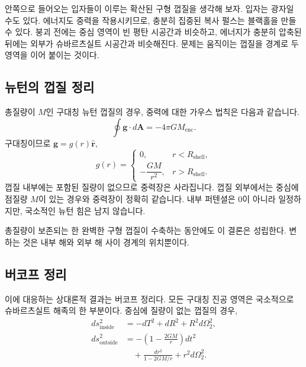 안쪽으로 들어오는 입자들이 이루는 확산된 구형 껍질을 생각해 보자. 입자는 광자일 수도 있다. 에너지도 중력을 작용시키므로, 충분히 집중된 복사 펄스는 블랙홀을 만들 수 있다. 붕괴 전에는 중심 영역이 빈 평탄 시공간과 비슷하고, 에너지가 충분히 압축된 뒤에는 외부가 슈바르츠실트 시공간과 비슷해진다. 문제는 움직이는 껍질을 경계로 두 영역을 이어 붙이는 것이다.

\subsection{뉴턴의 껍질 정리}

총질량이 \(M\)인 구대칭 뉴턴 껍질의 경우, 중력에 대한 가우스 법칙은 다음과 같습니다.
\begin{equation}
\oint \mathbf{g}\cdot d\mathbf{A}=-4\pi G M_{\mathrm{enc}}.
\label{eq:l04-gauss-gravity}
\end{equation}
구대칭이므로 \(\mathbf{g}=g(r)\hat{\mathbf r}\),
\begin{equation}
g(r)=
\begin{cases}
0, & r<R_{\mathrm{shell}},\\[4pt]
-\dfrac{GM}{r^2}, & r>R_{\mathrm{shell}}.
\end{cases}
\label{eq:l04-shell-field}
\end{equation}
껍질 내부에는 포함된 질량이 없으므로 중력장은 사라집니다. 껍질 외부에서는 중심에 점질량 \(M\)이 있는 경우와 중력장이 정확히 같습니다. 내부 퍼텐셜은 0이 아니라 일정하지만, 국소적인 뉴턴 힘은 남지 않습니다.

총질량이 보존되는 한 완벽한 구형 껍질이 수축하는 동안에도 이 결론은 성립한다. 변하는 것은 내부 해와 외부 해 사이 경계의 위치뿐이다.

\subsection{버코프 정리}

이에 대응하는 상대론적 결과는 버코프 정리다. 모든 구대칭 진공 영역은 국소적으로 슈바르츠실트 해족의 한 부분이다. 중심에 질량이 없는 껍질의 경우,
\begin{align}
ds^2_{\mathrm{inside}}&=-dT^2+dR^2+R^2d\Omega_2^2,\\
ds^2_{\mathrm{outside}}&=
-\left(1-\frac{2GM}{r}\right)dt^2
\nonumber\\
&\quad+\frac{dr^2}{1-2GM/r}
+r^2d\Omega_2^2.
\label{eq:l04-birkhoff-pieces}
\end{align}

